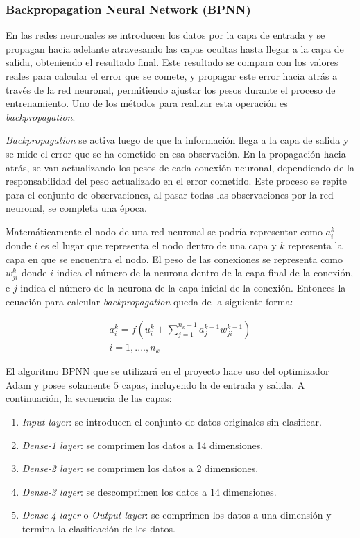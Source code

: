 \subsubsection{Backpropagation Neural Network (BPNN)}

  En las redes neuronales se introducen los datos por la capa de entrada y se propagan hacia adelante atravesando las capas ocultas hasta llegar a la capa de salida, obteniendo el resultado final. Este resultado se compara con los valores reales para calcular el error que se comete, y propagar este error hacia atr\'{a}s a trav\'{e}s de la red neuronal, permitiendo ajustar los pesos durante el proceso de entrenamiento. Uno de los m\'{e}todos para realizar esta operaci\'{o}n es \textit{backpropagation}.
  
  \textit{Backpropagation} se activa luego de que la informaci\'{o}n llega a la capa de salida y se mide el error que se ha cometido en esa observaci\'{o}n. En la propagaci\'{o}n hacia atr\'{a}s, se van actualizando los pesos de cada conexi\'{o}n neuronal, dependiendo de la responsabilidad del peso actualizado en el error cometido. Este proceso se repite para el conjunto de observaciones, al pasar todas las observaciones por la red neuronal, se completa una \'{e}poca.
  
  Matem\'{a}ticamente el nodo de una red neuronal se podr\'{i}a representar como $a_{i}^{k}$ donde $i$ es el lugar que representa el nodo dentro de una capa y $k$ representa la capa en que se encuentra el nodo. El peso de las conexiones se representa como $w_{ji}^{k}$ donde $i$ indica el n\'{u}mero de la neurona dentro de la capa final de la conexi\'{o}n, e $j$ indica el n\'{u}mero de la neurona de la capa inicial de la conexi\'{o}n. Entonces la ecuaci\'{o}n para calcular \textit{backpropagation} queda de la siguiente forma:

\begin{align}
	a_{i}^{k}=f(u_{i}^{k}+\sum_{j=1}^{n_{k}-1}a_{j}^{k-1}w_{ji}^{k-1}) \\
	i = 1, ...., n_{k}
\end{align}

  El algoritmo BPNN que se utilizar\'{a} en el proyecto hace uso del optimizador Adam y posee solamente $5$ capas, incluyendo la de entrada y salida. A continuaci\'{o}n, la secuencia de las capas:
  
  \begin{enumerate}
  	\item \textit{Input layer}: se introducen el conjunto de datos originales sin clasificar.
  	\item \textit{Dense-1 layer}: se comprimen los datos a 14 dimensiones.
  	\item \textit{Dense-2 layer}: se comprimen los datos a 2 dimensiones.
  	\item \textit{Dense-3 layer}: se descomprimen los datos a 14 dimensiones.
  	\item \textit{Dense-4 layer} o \textit{Output layer}: se comprimen los datos a una dimensi\'{o}n y termina la clasificaci\'{o}n de los datos.
  \end{enumerate}


